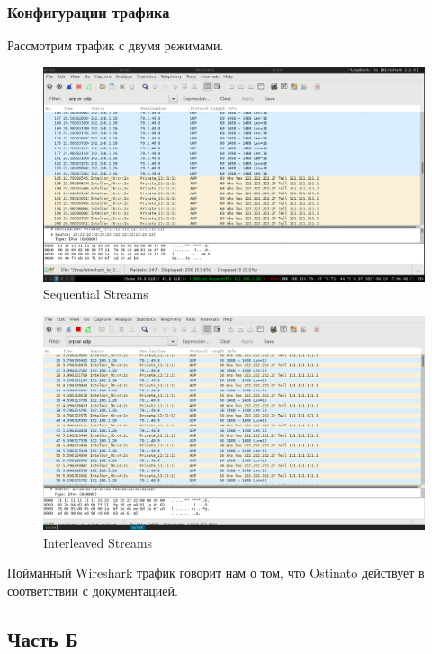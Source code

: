 \documentclass[12pt, a4paper] {ncc}
\begin{document}
\subsubsection*{Конфигурации трафика}
	Рассмотрим трафик с двумя режимами. \\

	\begin{figure}[h!]
		\includegraphics[scale=0.4]{Seq.png}
		\caption{Sequential Streams}
		\center
	\end{figure}

	\begin{figure}[h!]
		\includegraphics[scale=0.4]{Interleave.png}
		\caption{Interleaved Streams}
		\center
	\end{figure}

	Пойманный Wireshark трафик говорит нам о том, что Ostinato действует в соответствии с
	документацией. \\

\subsection*{Часть Б}
\end{document}
